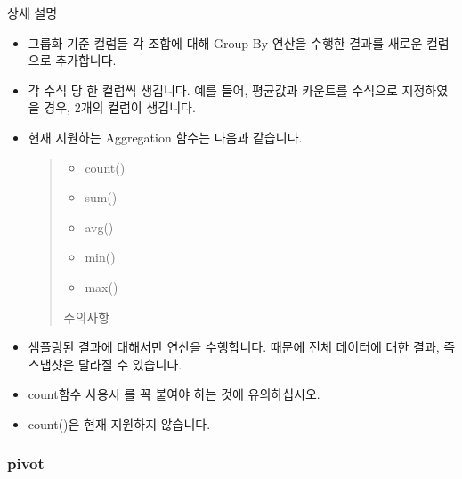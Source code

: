 \documentclass[letterpaper,10pt,english]{sphinxmanual}
\begin{document}
상세 설명
\begin{itemize}
\item {} 
그룹화 기준 컬럼들 각 조합에 대해 Group By 연산을 수행한 결과를 새로운 컬럼으로 추가합니다.

\item {} 
각 수식 당 한 컬럼씩 생깁니다. 예를 들어, 평균값과 카운트를 수식으로 지정하였을 경우, 2개의 컬럼이 생깁니다.

\item {} 
현재 지원하는 Aggregation 함수는 다음과 같습니다.
\begin{quote}
\begin{itemize}
\item {} 
count()

\item {} 
sum()

\item {} 
avg()

\item {} 
min()

\item {} 
max()

\end{itemize}

주의사항
\end{quote}

\item {} 
샘플링된 결과에 대해서만 연산을 수행합니다. 때문에 전체 데이터에 대한 결과, 즉 스냅샷은 달라질 수 있습니다.

\item {} 
count함수 사용시 \sphinxcode{\sphinxupquote{()}} 를 꼭 붙여야 하는 것에 유의하십시오.

\item {} 
count()은 현재 지원하지 않습니다.
\begin{quote}

\begin{figure}[H]
\centering

\noindent{}
\end{figure}
\end{quote}

\end{itemize}


\subsubsection{pivot}
\label{\detokenize{discovery/part07/rule_kinds:pivot}}
\begin{figure}[H]
\centering

\noindent{}
\end{figure}
\end{document}
